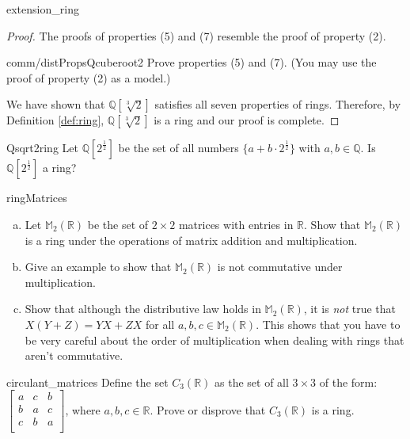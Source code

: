 \begin{example}{extension_ring}
\begin{proof}
The proofs of properties (5) and (7) resemble the proof of property (2).

\begin{exercise}{comm/distPropsQcuberoot2}
Prove properties (5) and (7). (You may use the proof of property (2) as a model.)
\end{exercise}{}

We have shown that ${\mathbb Q}[\sqrt[3]{2}]$ satisfies all seven properties of rings. Therefore, by Definition \ref{def:ring}, ${\mathbb Q}[\sqrt[3]{2}]$ is a ring and our proof is complete.
\end{proof}
\end{example}{}

\begin{exercise}{Qsqrt2ring}
Let ${\mathbb Q}[2^{\frac{1}{2}}]$ be the set of all numbers $\{a+b\cdot2^{\frac{1}{2}}\}$ with $a,b\in {\mathbb Q}$. Is ${\mathbb Q}[2^{\frac{1}{2}}]$ a ring?
\end{exercise}

\begin{exercise}{ringMatrices}
\begin{enumerate}[(a)]
\item Let ${\mathbb M}_2({\mathbb R})$ be the set of  $2\times 2$ matrices with entries in ${\mathbb R}$. Show that ${\mathbb M}_2({\mathbb R})$ is a ring under the operations of matrix addition and multiplication.
\item Give an example to show that ${\mathbb M}_2({\mathbb R})$ is not commutative under multiplication.
\item Show that although the distributive law holds in ${\mathbb M}_2({\mathbb R})$, it is \emph{not} true that $X(Y+ Z) = YX + ZX$ for all $a,b,c \in {\mathbb M}_2({\mathbb R})$. This shows that you have to be very careful about the order of multiplication when dealing with rings that aren't commutative.
\end{enumerate}
\end{exercise}{}

\begin{exercise}{circulant_matrices}
Define the set $C_3({\mathbb R})$ as the set of all $3\times3$  of the form:
$\begin{bmatrix}
a & c & b\\
b & a & c\\
c & b & a\\
\end{bmatrix}$,
where $a,b,c\in{\mathbb R}$.  Prove or disprove that $C_3({\mathbb R})$ is a ring.
\end{exercise}


